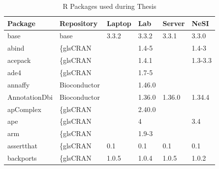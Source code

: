 \begin{longtable}{llllll}
\caption{R Packages used during Thesis}
\label{tab:computers_r_packages_full}
\\
\multicolumn{1}{l}{\bfseries Package}  & \multicolumn{1}{l}{\bfseries Repository}  & \multicolumn{1}{l}{\bfseries Laptop}      & \multicolumn{1}{l}{\bfseries Lab}         & \multicolumn{1}{l}{\bfseries Server}         & \multicolumn{1}{l}{\bfseries NeSI} \\ \hline \rowcolor{black!10}
base                          & base                      & 3.3.2       & 3.3.2       & 3.3.1          & 3.3.0             \\
\rowcolor{black!5}
abind                         & \{gls{CRAN}                      &             & 1.4-5       &                & 1.4-3              \\
\rowcolor{black!10}
acepack                       & \{gls{CRAN}                      &             & 1.4.1       &                & 1.3-3.3           \\
\rowcolor{black!5}
ade4                          & \{gls{CRAN}                      &             & 1.7-5       &                &                    \\
\rowcolor{black!10}
annaffy                       & Bioconductor              &             & 1.46.0      &                &                   \\
\rowcolor{black!5}
AnnotationDbi                 & Bioconductor              &             & 1.36.0      & 1.36.0         & 1.34.4             \\
\rowcolor{black!10}
apComplex                     & \{gls{CRAN}                      &             & 2.40.0      &                &                   \\
\rowcolor{black!5}
ape                           & \{gls{CRAN}                      &             & 4           &                & 3.4                \\
\rowcolor{black!10}
arm                           & \{gls{CRAN}                      &             & 1.9-3       &                &                   \\
\rowcolor{black!5}
assertthat                    & \{gls{CRAN}                      & 0.1         & 0.1         & 0.1            & 0.1                \\
\rowcolor{black!10}
backports                     & \{gls{CRAN}                      & 1.0.5       & 1.0.4       & 1.0.5          & 1.0.2             \\

\end{longtable}
